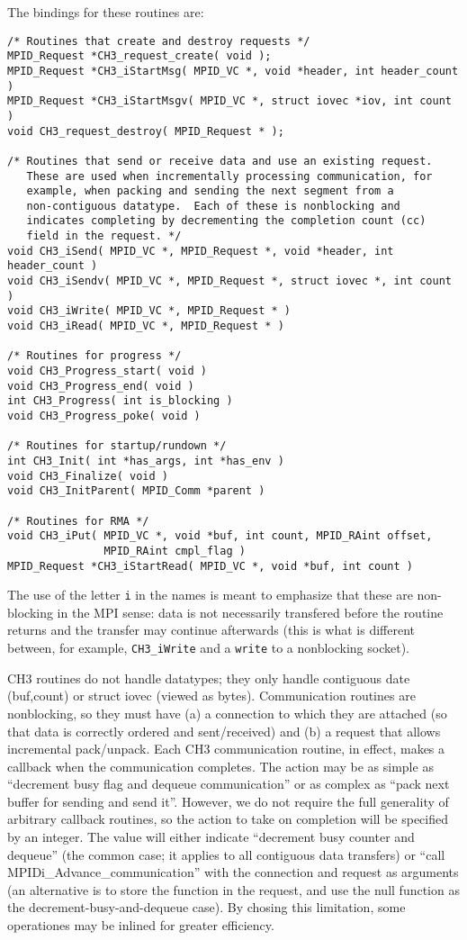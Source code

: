 \documentclass{article}
\def\code{\begingroup\makeustext\eatcode}
\def\eatcode#1{\texttt{#1}\endgroup}
\begin{document}
The bindings for these routines are:
\begin{verbatim}
/* Routines that create and destroy requests */
MPID_Request *CH3_request_create( void );
MPID_Request *CH3_iStartMsg( MPID_VC *, void *header, int header_count )
MPID_Request *CH3_iStartMsgv( MPID_VC *, struct iovec *iov, int count )
void CH3_request_destroy( MPID_Request * );

/* Routines that send or receive data and use an existing request.
   These are used when incrementally processing communication, for
   example, when packing and sending the next segment from a
   non-contiguous datatype.  Each of these is nonblocking and
   indicates completing by decrementing the completion count (cc)
   field in the request. */
void CH3_iSend( MPID_VC *, MPID_Request *, void *header, int header_count )
void CH3_iSendv( MPID_VC *, MPID_Request *, struct iovec *, int count )
void CH3_iWrite( MPID_VC *, MPID_Request * )
void CH3_iRead( MPID_VC *, MPID_Request * )

/* Routines for progress */
void CH3_Progress_start( void )
void CH3_Progress_end( void )
int CH3_Progress( int is_blocking )
void CH3_Progress_poke( void )

/* Routines for startup/rundown */
int CH3_Init( int *has_args, int *has_env )
void CH3_Finalize( void )
void CH3_InitParent( MPID_Comm *parent )

/* Routines for RMA */
void CH3_iPut( MPID_VC *, void *buf, int count, MPID_RAint offset, 
               MPID_RAint cmpl_flag )
MPID_Request *CH3_iStartRead( MPID_VC *, void *buf, int count )
\end{verbatim}

The use of the letter \code{i} in the names is meant to emphasize that these
are non-blocking in the MPI sense: data is not necessarily transfered before
the routine returns and the transfer may continue afterwards (this is what is
different between, for example, \code{CH3_iWrite} and a \code{write} to a
nonblocking socket).

CH3 routines do not handle datatypes; they only handle contiguous date 
(buf,count) or struct iovec 
(viewed 
as bytes).  Communication routines are nonblocking, so they must have (a) a
connection to which they are attached (so that data is correctly ordered and
sent/received) and (b) a request that allows incremental
pack/unpack.  Each CH3 communication routine, in effect, makes a callback when
the communication completes.  The action may be as simple as ``decrement busy
flag and dequeue communication'' or as complex as ``pack next buffer for
sending and send it''.  However, we do not require the full generality of
arbitrary callback routines, so the action to take on completion will be
specified by an integer.  The value will either indicate ``decrement busy
counter and dequeue'' (the common case; it applies to all contiguous data
transfers) or ``call MPIDi\_Advance\_communication'' with the connection and
request as arguments (an alternative is to store the function in the request,
and use the null function as the decrement-busy-and-dequeue case).
By chosing this limitation, some operationes may be inlined for
greater efficiency.
\end{document}
